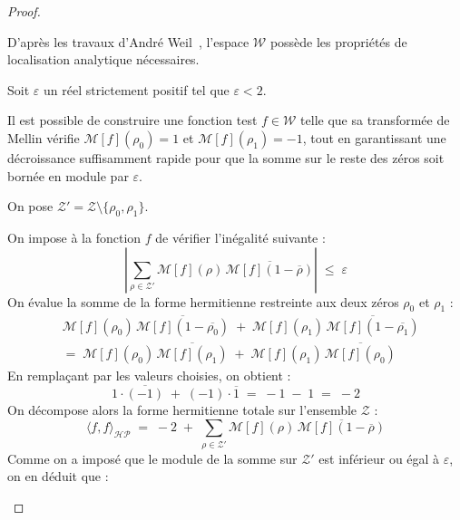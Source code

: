 \documentclass[Riemann_Hypothesis.tex]{subfiles}
\begin{document}
\begin{proof}
\begin{part_proof}
        D'après les travaux d'André Weil~\cite{weil1952_formules}, l'espace $\mathcal{W}$ possède les propriétés de localisation analytique nécessaires. \par
        Soit $\varepsilon$ un réel strictement positif tel que $\varepsilon < 2$. \par
        Il est possible de construire une fonction test $f \in \mathcal{W}$ telle que sa transformée de Mellin vérifie $\mathcal{M}[f](\rho_0) = 1$ et $\mathcal{M}[f](\rho_1) = -1$, tout en garantissant une décroissance suffisamment rapide pour que la somme sur le reste des zéros soit bornée en module par $\varepsilon$. \par
        On pose $\mathcal{Z}' = \mathcal{Z} \setminus \{\rho_0, \rho_1\}$. \par
        On impose à la fonction $f$ de vérifier l'inégalité suivante :
        \begin{equation*}
            \left| \sum_{\rho \in \mathcal{Z}'} \mathcal{M}[f](\rho) \, \overline{\mathcal{M}[f](1 - \overline{\rho})} \right| \;\leq\; \varepsilon
        \end{equation*}
        On évalue la somme de la forme hermitienne restreinte aux deux zéros $\rho_0$ et $\rho_1$ :
        \begin{align*}
            &\mathcal{M}[f](\rho_0) \,
            \overline{\mathcal{M}[f](1 - \overline{\rho_0})} \;+\;
            \mathcal{M}[f](\rho_1) \,
            \overline{\mathcal{M}[f](1 - \overline{\rho_1})}\\
            &=\; \mathcal{M}[f](\rho_0) \, \overline{\mathcal{M}[f](\rho_1)} \;+\; \mathcal{M}[f](\rho_1) \, \overline{\mathcal{M}[f](\rho_0)}
        \end{align*}
        En remplaçant par les valeurs choisies, on obtient :
        \begin{equation*}
            1 \cdot \overline{(-1)} \;+\; (-1) \cdot \overline{1} \;=\; -1 \;-\; 1 \;=\; -2
        \end{equation*}
        On décompose alors la forme hermitienne totale sur l'ensemble $\mathcal{Z}$ :
        \begin{equation*}
            \langle f, f \rangle_{\mathcal{HP}} \;=\; -2 \;+\; \sum_{\rho \in \mathcal{Z}'} \mathcal{M}[f](\rho) \, \overline{\mathcal{M}[f](1 - \overline{\rho})}
        \end{equation*}
        Comme on a imposé que le module de la somme sur $\mathcal{Z}'$ est inférieur ou égal à $\varepsilon$, on en déduit que :
        \begin{equation*}

\end{equation*}
\end{part_proof}
\end{proof}
\end{document}
